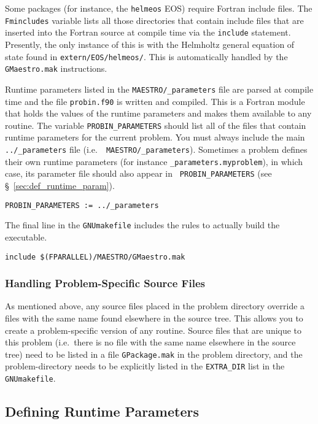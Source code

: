 Some packages (for instance, the {\tt helmeos}
EOS) require Fortran include files.  The {\tt Fmincludes} variable
lists all those directories that contain include files that are
inserted into the Fortran source at compile time via the {\tt include}
statement.  Presently, the only instance of this is with the Helmholtz
general equation of state found in {\tt extern/EOS/helmeos/}.  This is
automatically handled by the {\tt GMaestro.mak} instructions.

Runtime parameters listed in the {\tt MAESTRO/\_parameters} file are
parsed at compile time and the file {\tt probin.f90} is written and
compiled.  This is a Fortran module that holds the values of the
runtime parameters and makes them available to any routine.  The
variable {\tt PROBIN\_PARAMETERS} should list all of the files that
contain runtime parameters for the current problem.  You must always
include the main {\tt ../\_parameters} file (i.e.\ {\tt
  MAESTRO/\_parameters}).  Sometimes a problem defines their own
runtime parameters (for instance {\tt \_parameters.myproblem}), in which
case, its parameter file should also appear in {\tt
  PROBIN\_PARAMETERS} (see \S~\ref{sec:def_runtime_param}).
\begin{lstlisting}[language={[gnu]make},mathescape=false]
  PROBIN_PARAMETERS := ../_parameters
\end{lstlisting}

The final line in the {\tt GNUmakefile} includes the rules to actually
build the executable.
\begin{lstlisting}[language={[gnu]make},mathescape=false]
  include $(FPARALLEL)/MAESTRO/GMaestro.mak
\end{lstlisting}


\subsubsection{Handling Problem-Specific Source Files}

As mentioned above, any source files placed in the problem directory
override a files with the same name found elsewhere in the source
tree.  This allows you to create a problem-specific version of any
routine.  Source files that are unique to this problem (i.e.\ there is
no file with the same name elsewhere in the source tree) need to be
listed in a file {\tt GPackage.mak} in the problem directory, and
the problem-directory needs to be explicitly listed in the {\tt EXTRA\_DIR}
list in the {\tt GNUmakefile}.


\subsection{Defining Runtime Parameters}

